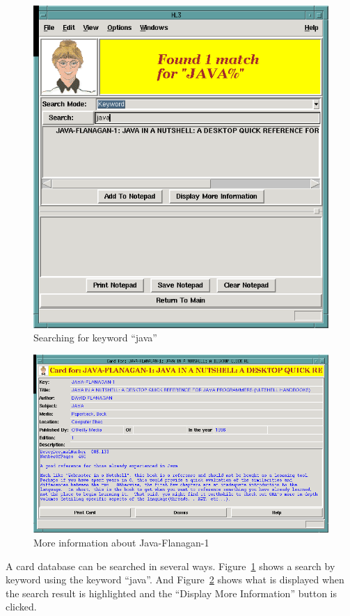 \begin{figure}[hpt]
\begin{centering}
\includegraphics[width=5in]{SearchKeywordJava.png}
\caption{Searching for keyword ``java''}
\label{fig:tut:searchkeywordjava}
\end{centering}
\end{figure}
\begin{figure}[hpt]
\begin{centering}
\includegraphics[width=5in]{MoreInformationJavaFlanagan1.png}
\caption{More information about Java-Flanagan-1}
\label{fig:tut:moreinfojavaflanagan1}
\end{centering}
\end{figure}
A card database can be searched in several ways. 
Figure~\ref{fig:tut:searchkeywordjava} shows a search by keyword using
the keyword ``java''. And Figure~\ref{fig:tut:moreinfojavaflanagan1}
shows what is displayed when the search result is highlighted and the
``Display More Information'' button is clicked.

